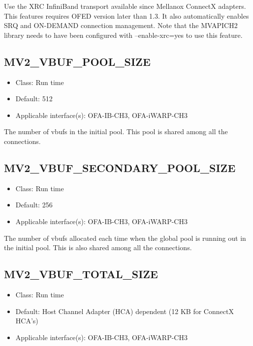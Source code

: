 Use the XRC InfiniBand transport available since Mellanox ConnectX adapters.
This features requires OFED version later than 1.3. It also automatically
enables SRQ and ON-DEMAND connection management. Note that the MVAPICH2
library needs to have been configured with --enable-xrc=yes to use this 
feature.

\subsection{MV2\_VBUF\_POOL\_SIZE}
\label{def:rdma-vbuf-pool-size}

\begin{itemize}
    \item Class: Run time

    \item Default: 512
    \item Applicable interface(s): OFA-IB-CH3, OFA-iWARP-CH3
\end{itemize}

The number of vbufs in the initial pool. This pool is shared among all
the connections.


\subsection{MV2\_VBUF\_SECONDARY\_POOL\_SIZE}
\label{def:rdma-vbuf-secondary-pool-size}

\begin{itemize}
    \item Class: Run time
    \item Default: 256
    \item Applicable interface(s): OFA-IB-CH3, OFA-iWARP-CH3
\end{itemize}

The number of vbufs allocated each time when the global pool is running
out in the initial pool. This is also shared among all the connections.

\subsection{MV2\_VBUF\_TOTAL\_SIZE}
\label{def:vbuf-total-size}

\begin{itemize}
    \item Class: Run time

    \item Default: Host Channel Adapter (HCA) dependent (12 KB for ConnectX HCA's)
    \item Applicable interface(s): OFA-IB-CH3, OFA-iWARP-CH3
\end{itemize}

